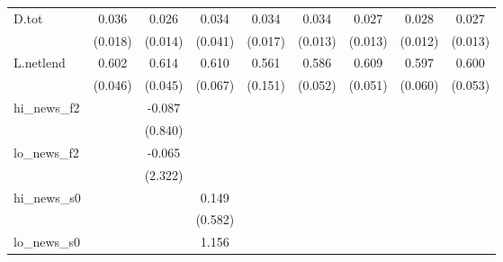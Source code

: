 {\begin{tabular}{l*{8}{c}}
\addlinespace
D.tot       &       0.036\sym{**} &       0.026\sym{*}  &       0.034         &       0.034\sym{**} &       0.034\sym{***}&       0.027\sym{**} &       0.028\sym{**} &       0.027\sym{**} \\
            &     (0.018)         &     (0.014)         &     (0.041)         &     (0.017)         &     (0.013)         &     (0.013)         &     (0.012)         &     (0.013)         \\
\addlinespace
L.netlend   &       0.602\sym{***}&       0.614\sym{***}&       0.610\sym{***}&       0.561\sym{***}&       0.586\sym{***}&       0.609\sym{***}&       0.597\sym{***}&       0.600\sym{***}\\
            &     (0.046)         &     (0.045)         &     (0.067)         &     (0.151)         &     (0.052)         &     (0.051)         &     (0.060)         &     (0.053)         \\
\addlinespace
hi\_news\_f2  &                     &      -0.087         &                     &                     &                     &                     &                     &                     \\
            &                     &     (0.840)         &                     &                     &                     &                     &                     &                     \\
\addlinespace
lo\_news\_f2  &                     &      -0.065         &                     &                     &                     &                     &                     &                     \\
            &                     &     (2.322)         &                     &                     &                     &                     &                     &                     \\
\addlinespace
hi\_news\_s0  &                     &                     &       0.149         &                     &                     &                     &                     &                     \\
            &                     &                     &     (0.582)         &                     &                     &                     &                     &                     \\
\addlinespace
lo\_news\_s0  &                     &                     &       1.156         &                     &                     &                     &                     &                     \\

\end{tabular}}
